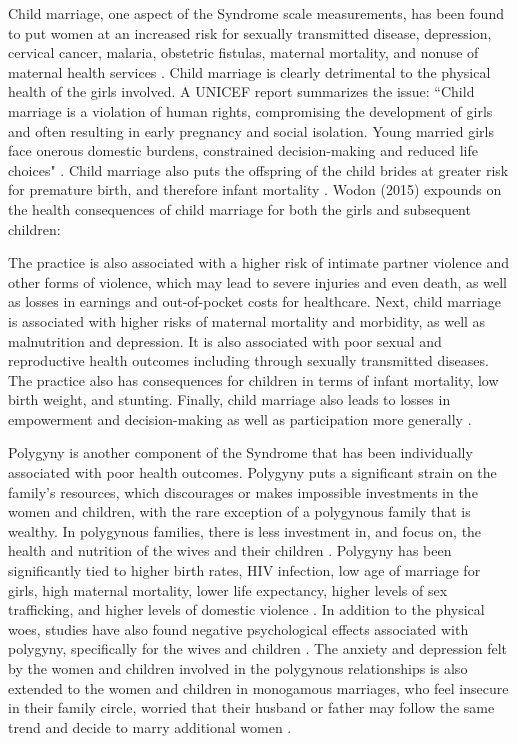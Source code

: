 Child marriage, one aspect of the Syndrome scale measurements, has been found to put women at an increased risk for sexually transmitted disease, depression, cervical cancer, malaria, obstetric fistulas, maternal mortality, and nonuse of maternal health services \citep{Raj, Nour, Nour2}. Child marriage is clearly detrimental to the physical health of the girls involved. A UNICEF report summarizes the issue: ``Child marriage is a violation of human rights, compromising the development of girls and often resulting in early pregnancy and social isolation. Young married girls face onerous domestic burdens, constrained decision-making and reduced life choices" \citep{unicef}. Child marriage also puts the offspring of the child brides at greater risk for premature birth, and therefore infant mortality \citep{Raj, Nour2}. Wodon (2015) expounds on the health consequences of child marriage for both the girls and subsequent children:

\singlespace 
The practice is also associated with a higher risk of intimate partner violence and other forms of violence, which may lead to severe injuries and even death, as well as losses in earnings and out-of-pocket costs for healthcare. Next, child marriage is associated with higher risks of maternal mortality and morbidity, as well as malnutrition and depression. It is also associated with poor sexual and reproductive health outcomes including through sexually transmitted diseases. The practice also has consequences for children in terms of infant mortality, low birth weight, and stunting. Finally, child marriage also leads to losses in empowerment and decision-making as well as participation more generally \citep{Wodon}.

\doublespace
Polygyny is another component of the Syndrome that has been individually associated with poor health outcomes. Polygyny puts a significant strain on the family's resources, which discourages or makes impossible investments in the women and children, with the rare exception of a polygynous family that is wealthy. In polygynous families, there is less investment in, and focus on, the health and nutrition of the wives and their children \citep{Monroe}. Polygyny has been significantly tied to higher birth rates, HIV infection, low age of marriage for girls, high maternal mortality, lower life expectancy, higher levels of sex trafficking, and higher levels of domestic violence \citep{McDermott}. In addition to the physical woes, studies have also found negative psychological effects associated with polygyny, specifically for the wives and children \citep{SPBC}. The anxiety and depression felt by the women and children involved in the polygynous relationships is also extended to the women and children in monogamous marriages, who feel insecure in their family circle, worried that their husband or father may follow the same trend and decide to marry additional women \citep{Hudson}.

